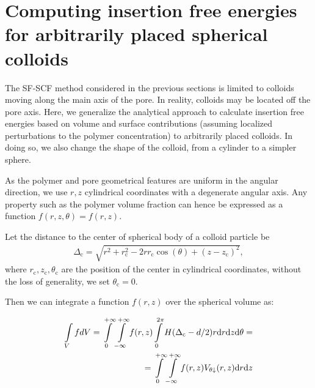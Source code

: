 \documentclass[10pt, a4paper]{article}
\begin{document}
\section{Computing insertion free energies for arbitrarily placed spherical colloids}
\begin{multicols}{2}

The SF-SCF method considered in the previous sections is limited to colloids moving along the main axis of the pore.
In reality, colloids may be located off the pore axis.
Here, we generalize the analytical approach to calculate insertion free energies based on volume and surface contributions (assuming localized perturbations to the polymer concentration) to arbitrarily placed colloids.
In doing so, we also change the shape of the colloid, from a cylinder to a simpler sphere.

As the polymer and pore geometrical features are uniform in the angular direction, we use $r, z$ cylindrical coordinates with a degenerate angular axis.
Any property such as the polymer volume fraction can hence be expressed as a function $f(r,z,\theta) = f(r,z)$.

Let the distance to the center of spherical body of a colloid particle be 
\begin{eqnarray}
\Delta_{\text{c}} = \sqrt{r^2 + r_{\text{c}}^2 - 2 r r_{\text{c}} \cos(\theta) + (z - z_{\text{c}})^2},
\end{eqnarray} 
where $r_{\text{c}}, z_{\text{c}}, \theta_{\text{c}}$ are the position of the center in cylindrical coordinates, without the loss of generality, we set $\theta_{\text{c}} = 0$.

Then we can integrate a function $f(r,z)$ over the spherical volume as:

\begin{eqnarray}
    \label{eq:int_indicator_V}
    \begin{aligned}
        \int\limits_{V} f dV
        =\int\displaylimits_{0}^{+\infty} \int\displaylimits_{-\infty}^{+\infty} f(r, z) \int\displaylimits_{0}^{2\pi}  H(\Delta_{\text{c}} - d/2) r \text{d}r \text{d}z \text{d}\theta =\\
        =\int\displaylimits_{0}^{+\infty} \int\displaylimits_{-\infty}^{+\infty} f(r, z)  V_{\theta \downarrow}(r,z) \text{d}r \text{d}z
    \end{aligned}
\end{eqnarray}


\end{multicols}
\end{document}
